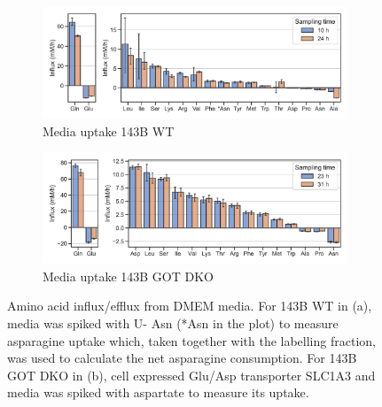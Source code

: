 \begin{figure}
     \centering
     \begin{subfigure}[b]{0.75\textwidth}
         \centering
         \includegraphics[width=\textwidth]{figures/chap2/flux_143wt.pdf}
         \caption{Media uptake 143B WT}
         \label{fig:ch2:flux_143wt}
     \end{subfigure}
     \begin{subfigure}[b]{0.75\textwidth}
         \centering
         \includegraphics[width=\textwidth]{figures/chap2/flux_143dko.pdf}
         \caption{Media uptake 143B GOT DKO}
         \label{fig:ch2:flux_143dko}
     \end{subfigure}
        \caption[Media amino acid uptake.]{
        Amino acid influx/efflux from DMEM media.
        For 143B WT in (a), media was spiked with U-\hCi{} Asn (*Asn in the plot) to measure asparagine uptake which, taken together with the labelling fraction, was used to calculate the net asparagine consumption.
        For 143B GOT DKO in (b), cell expressed Glu/Asp transporter SLC1A3 and media was spiked with aspartate to measure its uptake.
        }
        \label{fig:ch2:flux_143wt_dko}
\end{figure}

